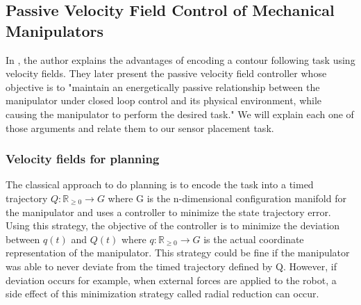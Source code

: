 \subsection{Passive Velocity Field Control of Mechanical Manipulators}
In \cite{li1999passive}, the author explains the advantages of encoding a contour following task using velocity fields. 
They later present the passive velocity field controller whose objective is to "maintain an energetically passive relationship between the manipulator under closed loop control and
its physical environment, while causing the manipulator to perform the desired task." 
We will explain each one of those arguments and relate them to our sensor placement task.
\subsubsection{Velocity fields for planning}
The classical approach to do planning is to encode the task into a timed trajectory $Q:\mathbb R_{\ge 0} \rightarrow G$ where G is the n-dimensional configuration manifold for the manipulator and uses a controller to minimize the state trajectory error.
Using this strategy, the objective of the controller is to minimize the deviation between $q(t)$ and $Q(t)$ where $q:\mathbb R_{\ge 0} \rightarrow G$ is the actual coordinate representation of the manipulator.
This strategy could be fine if the manipulator was able to never deviate from the timed trajectory defined by Q. However, if deviation occurs for example, when external forces are applied to the
robot, a side effect of this minimization strategy called radial reduction can occur.

